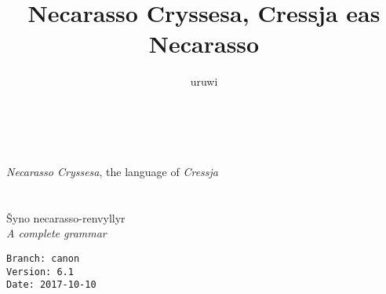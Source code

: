 \documentclass{book}
\title{Necarasso Cryssesa, Cressja eas Necarasso}
\author{uruwi}
\begin{document}
\pagecolor{SkyBlue!25}

\begin{titlepage}
    \makeatletter
    \begin{center}
        {\color{Aquamarine} \hprule \vspace{1.5ex} \\}
        {\Huge \sffamily \textcolor{Cerulean}{\@title}\\}
        {\large \textit{Necarasso Cryssesa}, the language of \textit{Cressja} \\}
        {\color{Aquamarine} \hprule \vspace{1.5ex} \\}
        \vspace{1.5cm}
        {\Large\bfseries \@author}\\[5pt]
        \vspace{2cm}
        {Šyno necarasso-renvyllyr} \\[5pt]
        \emph{A complete grammar}\\[2cm]
        \vfill
        \vfill
        {\@date}
    \end{center}
    \makeatother
\end{titlepage}

\pagecolor{SkyBlue!15}

\begin{verbatim}
Branch: canon
Version: 6.1
Date: 2017-10-10
\end{verbatim}
\end{document}
